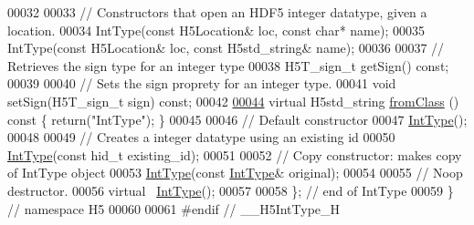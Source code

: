 \begin{DoxyCode}
00032 
00033         \textcolor{comment}{// Constructors that open an HDF5 integer datatype, given a location.}
00034         IntType(\textcolor{keyword}{const} H5Location& loc, \textcolor{keyword}{const} \textcolor{keywordtype}{char}* name);
00035         IntType(\textcolor{keyword}{const} H5Location& loc, \textcolor{keyword}{const} H5std\_string& name);
00036 
00037         \textcolor{comment}{// Retrieves the sign type for an integer type}
00038         H5T\_sign\_t getSign() \textcolor{keyword}{const};
00039 
00040         \textcolor{comment}{// Sets the sign proprety for an integer type.}
00041         \textcolor{keywordtype}{void} setSign(H5T\_sign\_t sign) \textcolor{keyword}{const};
00042 
\hyperlink{class_h5_1_1_int_type_a8e4d3767868034eeb45d362cd6201adc}{00044}         \textcolor{keyword}{virtual} H5std\_string \hyperlink{class_h5_1_1_int_type_a8e4d3767868034eeb45d362cd6201adc}{fromClass} ()\textcolor{keyword}{ const }\{ \textcolor{keywordflow}{return}(\textcolor{stringliteral}{"IntType"}); \}
00045 
00046         \textcolor{comment}{// Default constructor}
00047         \hyperlink{class_h5_1_1_int_type}{IntType}();
00048 
00049         \textcolor{comment}{// Creates a integer datatype using an existing id}
00050         \hyperlink{class_h5_1_1_int_type}{IntType}(\textcolor{keyword}{const} hid\_t existing\_id);
00051 
00052         \textcolor{comment}{// Copy constructor: makes copy of IntType object}
00053         \hyperlink{class_h5_1_1_int_type}{IntType}(\textcolor{keyword}{const} \hyperlink{class_h5_1_1_int_type}{IntType}& original);
00054 
00055         \textcolor{comment}{// Noop destructor.}
00056         \textcolor{keyword}{virtual} ~\hyperlink{class_h5_1_1_int_type}{IntType}();
00057 
00058 \}; \textcolor{comment}{// end of IntType}
00059 \} \textcolor{comment}{// namespace H5}
00060 
00061 \textcolor{preprocessor}{#endif // \_\_H5IntType\_H}
\end{DoxyCode}
